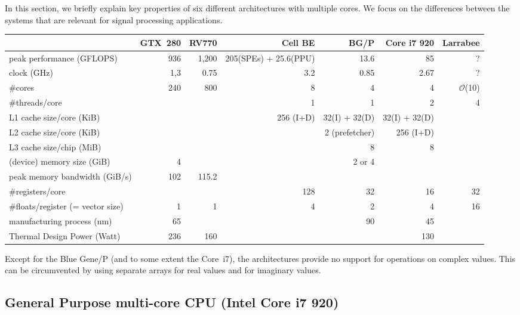 \documentclass{article}
\begin{document}
In this section, we briefly explain key properties of six different
architectures with multiple cores.  We focus on the differences
between the systems that are relevant for signal processing
applications.

\begin{table}
\begin{center}
\begin{small}
\begin{tabular}{|l|rrrrrr|}
\hline
& GTX~280 & RV770 & Cell BE & BG/P & Core i7 920 & Larrabee \\
\hline
peak performance (GFLOPS) & 936 & 1,200 & 205(SPEs) + 25.6(PPU) & 13.6 & 85 & ? \\
clock (GHz) & 1,3 & 0.75 & 3.2 & 0.85 & 2.67 & ? \\
\#cores & 240 & 800 & 8 & 4 & 4 & $\mathcal{O}$(10) \\
\#threads/core & & & 1 & 1 & 2 & 4 \\
L1 cache size/core (KiB) & & & 256 (I+D) & 32(I) + 32(D) & 32(I) + 32(D) & \\
L2 cache size/core (KiB) & & & & 2 (prefetcher) & 256 (I+D) & \\
L3 cache size/chip (MiB) & & & & 8 & 8 & \\
(device) memory size (GiB) & 4 & &  & 2 or 4 & & \\
peak memory bandwidth (GiB/s) & 102 & 115.2 & & & & \\
\#registers/core & & & 128 & 32 & 16 & 32 \\
\#floats/register (= vector size) & 1 & 1  & 4 & 2 & 4 & 16 \\
manufacturing process (nm) & 65 & & & 90 & 45 & \\
Thermal Design Power (Watt) & 236 & 160 & & & 130 & \\
\hline
\end{tabular}
\end{small}
\end{center}
\end{table}


Except for the Blue Gene/P (and to some extent the Core~i7), the architectures
provide no support for operations on complex values.
This can be circumvented by using separate arrays for real values and for
imaginary values.


\subsection{General Purpose multi-core CPU (Intel Core i7 920)}
\end{document}

